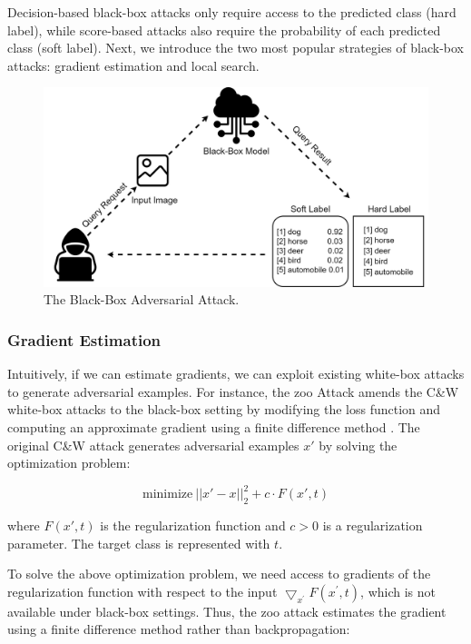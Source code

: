 Decision-based black-box attacks only require access to the predicted class (hard label), while score-based attacks also require the probability of each predicted class (soft label).  Next, we introduce the two most popular strategies of black-box attacks: gradient estimation and local search.

\begin{figure}[H]
\centering
\includegraphics[width=\textwidth]{figures/chapter_intro/black-box.jpg}
\caption{The Black-Box Adversarial Attack.}
\label{fig.decision}
\end{figure}

\clearpage

\subsubsection{Gradient Estimation}

Intuitively, if we can estimate gradients, we can exploit existing white-box attacks to generate adversarial examples. For instance, the \acrfull{zoo} Attack amends the C\&W white-box attacks to the black-box setting by modifying the loss function and computing an approximate gradient using a finite difference method \citep{Chen_2017}. The original C\&W attack generates adversarial examples $x'$ by solving the optimization problem:

\begin{equation}
    \text{minimize}\ ||x'-x||^2_2 + c \cdot F(x', t)
\end{equation}

where $F(x', t)$ is the regularization function and $c>0$ is a regularization parameter. The target class is represented with $t$.

To solve the above optimization problem, we need access to gradients of the regularization function with respect to the input $\bigtriangledown_{x^{'}} F(x^{'}, t)$, which is not available under black-box settings. Thus, the \acrshort{zoo} attack estimates the gradient using a finite difference method rather than backpropagation:

